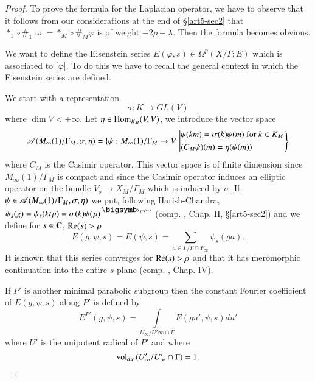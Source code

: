 \begin{proof}
To prove the formula for the Laplacian operator, we have to observe that it follows from our considerations at the end of \S \ref{art5-sec2} that $\ast_1 \circ \#_1 \varpi = \ast_M \circ \#_M \varphi$ is of weight $-2 \rho - \lambda$. Then the formula becomes obvious. 

We want to define the Eisenstein series $E(\varphi, s) \in \Omega^p (X/ \Gamma ; E)$ which is associated to [$\varphi$]. To do this we have to recall the general context in which the Eisenstein series are defined.

We start with a representation
$$
\sigma : K \longrightarrow G L (V)
$$
where $\dim V < + \infty$. Let $\eta  \in \operatorname{Hom}_{K_M} (V, V)$, we introduce the vector space
{\fontsize{10}{12}
$$
\mathscr{A} (M_\infty (1) / \Gamma_M , \sigma, \eta) = \{\psi: M_\infty (1)/ \Gamma_M \to V
\left.
\left|
\begin{aligned}
&\psi(km) = \sigma (k) \psi (m) \text{ for } k \in K_M\\
&(C_M \psi) (m) = \eta (\psi (m))
\end{aligned}
\right.
\right\}
$$}
where $C_M$ is the Casimir operator. This vector space is of finite dimension since $M_\infty (1)/ \Gamma _M$ is compact and since the Casimir operator induces an elliptic operator on the bundle $V_\sigma \to X_M / \Gamma_M$ which is induced by $\sigma$. If $\psi \in \mathscr{A}(M_\infty (1)/\Gamma_M, \sigma, \eta)$ we put, following Harish-Chandra, $\psi_s (g) = \psi_s (ktp) =\sigma (k) \psi (p)^{\bigdot t ^{-\rho - s}}$ (comp. \cite{art5-key7}, Chap. II, \S \ref{art5-sec2}) and we define for $s \in \mathbf{C}$, $\operatorname{Re} (s) > \rho$
$$
E (g, \psi, s) = E (\psi, s) = \sum\limits_{a \in \Gamma / \Gamma \cap P_\infty} \psi_s (ga).
$$
It is\pageoriginale known that this series converges for $\operatorname{Re} (s) > \rho$ and that it has meromorphic continuation into the entire $s$-plane (comp. \cite{art5-key8}, Chap. IV).

If $P'$ is another minimal parabolic subgroup then the constant Fourier coefficient of $E(g, \psi, s)$ along $P'$ is defined by 
$$
E^{P'} (g,\psi, s) = \int\limits_{U_\infty / U' \infty \cap \Gamma} E (gu', \psi, s) d u'
$$
where $U'$ is the unipotent radical of $P'$ and where
$$
\operatorname{vol}_{du'} (U'_\infty/ U'_\infty \cap \Gamma) =1.
$$


\end{proof}

